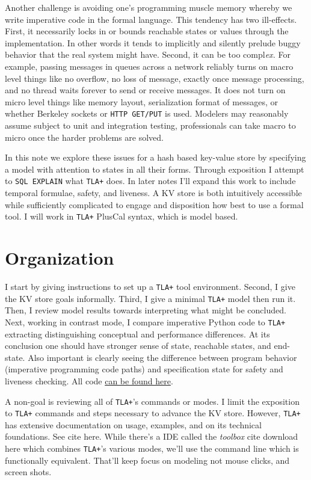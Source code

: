 \documentclass[twocolumn]{article}
\begin{document}
Another challenge is avoiding one's programming muscle memory whereby we write imperative code in the formal language. This tendency has two ill-effects. First, it necessarily locks in or bounds reachable states or values through the implementation. In other words it tends to implicitly and silently prelude buggy behavior that the real system might have. Second, it can be too compl\emph{ex.} For example, passing messages in queues across a network reliably turns on macro level things like no overflow, no loss of message, exactly once message processing, and no thread waits forever to send or receive messages. It does not turn on micro level things like memory layout, serialization format of messages, or whether Berkeley sockets or \texttt{HTTP GET/PUT} is used. Modelers may reasonably assume subject to unit and integration testing, professionals can take macro to micro once the harder problems are solved.

In this note we explore these issues for a hash based key-value store by specifying a model with attention to states in all their forms. Through exposition I attempt to \texttt{SQL EXPLAIN} what \texttt{TLA+} does. In later notes I'll expand this work to include temporal formulae, safety, and liveness. A KV store is both intuitively accessible while sufficiently complicated to engage and disposition how best to use a formal tool. I will work in \texttt{TLA+} PlusCal syntax, which is model based. 

\section{Organization}
I start by giving instructions to set up a \texttt{TLA+} tool environment. Second, I give the KV store goals informally. Third, I give a minimal \texttt{TLA+} model then run it. Then, I review model results towards interpreting what might be concluded. Next, working in contrast mode, I compare imperative Python code to \texttt{TLA+} extracting distinguishing conceptual and performance differences. At its conclusion one should have stronger sense of state, reachable states, and end-state. Also important is clearly seeing the difference between program behavior (imperative programming code paths) and specification state for safety and liveness checking. All code \href{https://github.com/rodgarrison/tla\_note1.git}{can be found here}.

A non-goal is reviewing all of \texttt{TLA+}'s commands or modes. I limit the exposition to \texttt{TLA+} commands and steps necessary to advance the KV store. However, \texttt{TLA+} has extensive documentation on usage, examples, and on its technical foundations. See cite here. While there's a IDE called the \emph{toolbox} cite download here which combines \texttt{TLA+}'s various modes, we'll use the command line which is functionally equivalent. That'll keep focus on modeling not mouse clicks, and screen shots.
 
\end{document}
